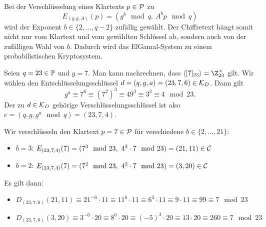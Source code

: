 \begin{remark}
 Bei der Verschlüsselung eines Klartexts $p \in \mathcal P$ zu 
 \[E_{(q, g, A)}(p) = (g^b \mod q,\   A^bp \mod q)\]
 wird der Exponent $b \in \{2, \dotsc, q-2\}$ zufällig gewählt. Der Chiffretext hängt somit nicht nur vom Klartext und vom gewählten Schlüssel ab, sondern auch von der zufälligen Wahl von $b$. Dadurch wird das ElGamal-System zu einem probabilistischen Kryptosystem.
\end{remark}


\begin{example}
 Seien $q = 23 \in \mathbb P$ und $g = 7$. Man kann nachrechnen, dass $\langle [7]_{23} \rangle = \Z_{23}^{\times}$ gilt. Wir wählen den Entschlüsselungsschlüssel $d = (q, g, a) = (23, 7, 6) \in \mathcal K_D$. Dann gilt 
 \[g^a \equiv 7^6 \equiv (7^2)^3 \equiv 49^3 \equiv 3^3 \equiv 4 \mod 23.\] 
 Der zu $d \in \mathcal K_D$ gehörige Verschlüsselungsschlüssel ist also $e = (q, g, g^a \mod q) = (23, 7, 4)$.
 
 Wir verschlüsseln den Klartext $p = 7 \in \mathcal P$ für verschiedene $b \in \{2, \dots, 21\}$:
 
\begin{itemize}
 \item $b=3$: \; $E_{(23, 7, 4)}(7) = (7^3 \mod 23,\  4^3 \cdot 7 \mod 23) = (21, 11) \in \mathcal C$
 \item $b=2$: \; $E_{(23, 7, 4)}(7) = (7^2 \mod 23,\  4^2 \cdot 7 \mod 23) = (3, 20) \in \mathcal C$
 \end{itemize}
 
 Es gilt dann:
 \begin{itemize}
  \item $D_{(23, 7, 6)}(21, 11) \equiv 21^{-6} \cdot 11 \equiv 11^6 \cdot 11 \equiv 6^3 \cdot 11 \equiv  9 \cdot 11 \equiv 99  \equiv 7 \mod 23$
  \item $D_{(23, 7, 6)}(3, 20) \equiv 3^{-6} \cdot 20 \equiv 8^6 \cdot 20 \equiv (-5)^3 \cdot 20 \equiv 13 \cdot 20 \equiv 260 \equiv 7 \mod 23$ 
 \end{itemize}
 
\end{example}


